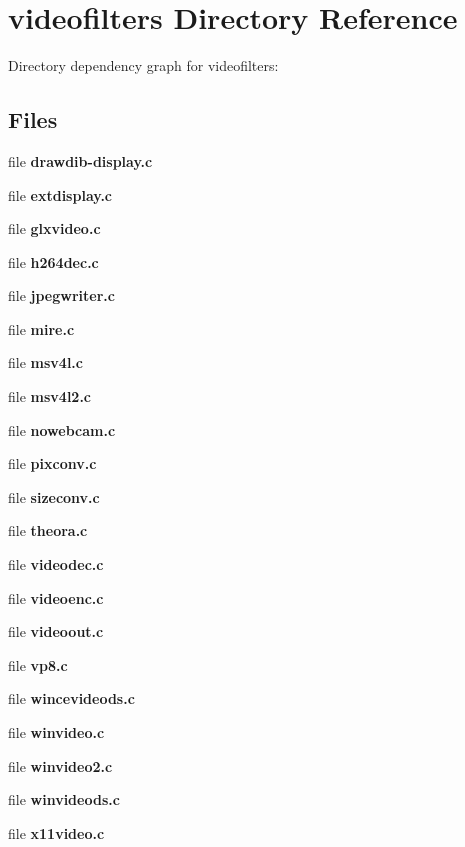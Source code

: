 \section{videofilters Directory Reference}
\label{dir_e8fd8a09e25a8b5f58aa1cf2dc049219}
Directory dependency graph for videofilters\-:
\subsection*{Files}
\begin{DoxyCompactItemize}
\item 
file {\bfseries drawdib-\/display.\-c}
\item 
file {\bfseries extdisplay.\-c}
\item 
file {\bfseries glxvideo.\-c}
\item 
file {\bfseries h264dec.\-c}
\item 
file {\bfseries jpegwriter.\-c}
\item 
file {\bfseries mire.\-c}
\item 
file {\bfseries msv4l.\-c}
\item 
file {\bfseries msv4l2.\-c}
\item 
file {\bfseries nowebcam.\-c}
\item 
file {\bfseries pixconv.\-c}
\item 
file {\bfseries sizeconv.\-c}
\item 
file {\bfseries theora.\-c}
\item 
file {\bfseries videodec.\-c}
\item 
file {\bfseries videoenc.\-c}
\item 
file {\bfseries videoout.\-c}
\item 
file {\bfseries vp8.\-c}
\item 
file {\bfseries wincevideods.\-c}
\item 
file {\bfseries winvideo.\-c}
\item 
file {\bfseries winvideo2.\-c}
\item 
file {\bfseries winvideods.\-c}
\item 
file {\bfseries x11video.\-c}
\end{DoxyCompactItemize}
